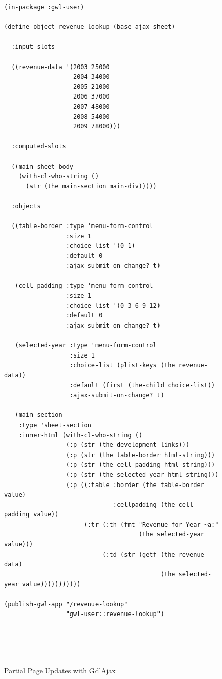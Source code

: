 \documentclass [11pt]{book}
\begin{document}
\begin{figure}
\begin{lrbox}{\boxedverb}
\begin{minipage}{\linewidth}
\tiny{

\begin{verbatim}(in-package :gwl-user)

(define-object revenue-lookup (base-ajax-sheet)
  
  :input-slots
  
  ((revenue-data '(2003 25000
                   2004 34000
                   2005 21000
                   2006 37000
                   2007 48000
                   2008 54000
                   2009 78000)))
  
  :computed-slots
  
  ((main-sheet-body 
    (with-cl-who-string ()
      (str (the main-section main-div)))))
  
  :objects
  
  ((table-border :type 'menu-form-control
                 :size 1
                 :choice-list '(0 1)
                 :default 0
                 :ajax-submit-on-change? t)
   
   (cell-padding :type 'menu-form-control
                 :size 1
                 :choice-list '(0 3 6 9 12)
                 :default 0
                 :ajax-submit-on-change? t)
   
   (selected-year :type 'menu-form-control
                  :size 1
                  :choice-list (plist-keys (the revenue-data))
                  :default (first (the-child choice-list))
                  :ajax-submit-on-change? t)
   
   (main-section 
    :type 'sheet-section
    :inner-html (with-cl-who-string ()
                 (:p (str (the development-links)))
                 (:p (str (the table-border html-string)))
                 (:p (str (the cell-padding html-string)))
                 (:p (str (the selected-year html-string)))
                 (:p ((:table :border (the table-border value)
                              :cellpadding (the cell-padding value))
                      (:tr (:th (fmt "Revenue for Year ~a:" 
                                     (the selected-year value)))
                           (:td (str (getf (the revenue-data) 
                                           (the selected-year value)))))))))))

(publish-gwl-app "/revenue-lookup" 
                 "gwl-user::revenue-lookup")





\end{verbatim}}
\end{minipage}
\end{lrbox}
\fbox{\usebox{\boxedverb}}

\caption{Partial Page Updates with GdlAjax}

\label{fig:gwl-4}

\end{figure}
\end{document}
